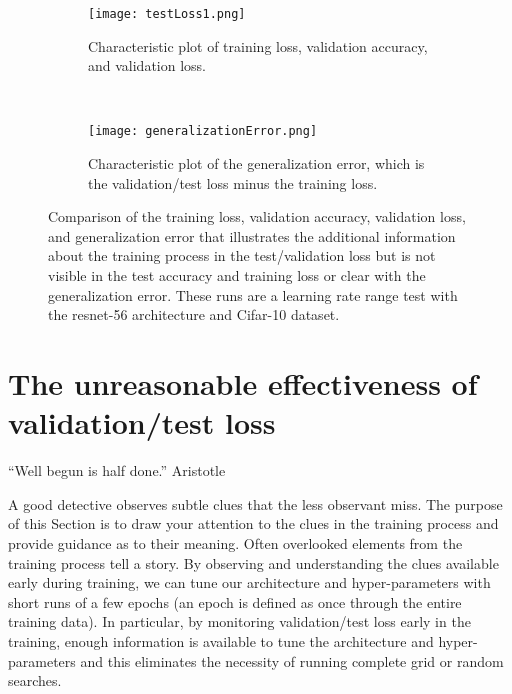\documentclass{article} %
\begin{document}
\begin{figure}[tbh]
	\centering
	\begin{subfigure}[b]{0.47\textwidth}
		\texttt{[image: testLoss1.png]}
		\caption{Characteristic plot of training loss, validation accuracy, and validation loss.  }
		\label{fig:testLoss1}       %
	\end{subfigure}
	\quad
	\hfill
	~ %
	\centering
	\begin{subfigure}[b]{0.47\textwidth}
		\texttt{[image: generalizationError.png]}
		\caption{Characteristic plot of the generalization error, which is the validation/test loss minus the training loss. }
		\label{fig:generalizationError}       %
	\end{subfigure}
	\caption{Comparison of the training loss, validation accuracy, validation loss, and generalization error that illustrates the additional information about the training process in the test/validation loss but is not visible in the test accuracy and training loss or clear with  the generalization error. These runs are a learning rate range test with the resnet-56 architecture and Cifar-10 dataset.}
	\label{fig:testLossClues}
	\vspace{-5pt}	
\end{figure}



\section{The unreasonable effectiveness of validation/test loss}
\label{sec:method}

\begin{displayquote}
``Well begun is half done.'' Aristotle
\end{displayquote}

A good detective observes subtle clues that the less observant miss.  The purpose of this Section is to draw your attention to the clues in the training process and provide guidance as to their meaning.   Often overlooked elements from the training process tell a story. By observing and understanding the clues available early during training, we can tune our architecture and hyper-parameters with short runs of a few epochs (an epoch is defined as once through the entire training data).  In particular, by monitoring validation/test loss  early in the training, enough information is available to tune the architecture and hyper-parameters and this eliminates the necessity of running complete grid or random searches.  
\end{document}
